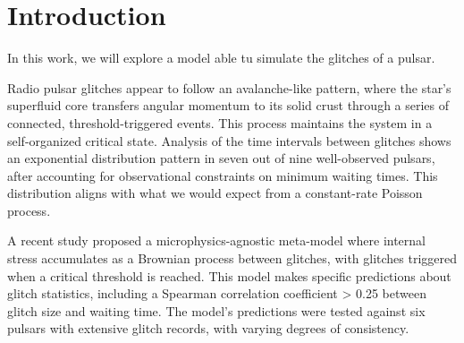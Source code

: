 \chapter{Introduction}

In this work, we will explore a model able tu simulate the glitches of a pulsar.

Radio pulsar glitches appear to follow an avalanche-like pattern\cite{Melatos_2008}, where the star's superfluid core transfers angular momentum to its solid crust through a series of connected, threshold-triggered events. This process maintains the system in a self-organized critical state.
Analysis of the time intervals between glitches shows an exponential distribution pattern in seven out of nine well-observed pulsars, after accounting for observational constraints on minimum waiting times. This distribution aligns with what we would expect from a constant-rate Poisson process.

A recent study \cite{10.1093/mnras/staa935} proposed a microphysics-agnostic meta-model where internal stress accumulates as a Brownian process between glitches, with glitches triggered when a critical threshold is reached. This model makes specific predictions about glitch statistics, including a Spearman correlation coefficient > 0.25 between glitch size and waiting time. The model's predictions were tested against six pulsars with extensive glitch records, with varying degrees of consistency.
